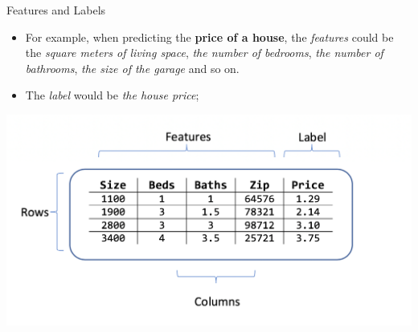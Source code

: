 \documentclass[11pt]{beamer}
\begin{document}
\begin{frame}{Features and Labels}
	\begin{itemize}
		\item For example, when predicting the \textbf{price of a house}, the \textit{features} could be the \textit{square meters of living space}, \textit{the number of bedrooms}, \textit{the number of bathrooms}, \textit{the size of the garage} and so on. 
		\item The \textit{label} would be \textit{the house price};  
	\end{itemize}
\begin{center}
\includegraphics[scale=.35]{../05-pictures/lesson-1-1_pic_7.png} 
\end{center}	
\end{frame}
%
\end{document}
